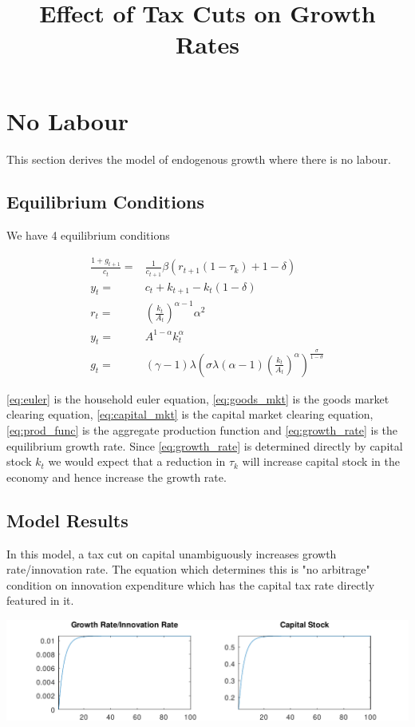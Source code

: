 \documentclass[a4paper 12pt]{article}
\title{Effect of Tax Cuts on Growth Rates}
\begin{document}
\maketitle

\section{No Labour}

This section derives the model of endogenous growth where there is no labour. 

\subsection{Equilibrium Conditions}

We have 4 equilibrium conditions

\begin{align}
    \frac{1+g_{t+1}}{c_t} =& \frac{1}{c_{t+1}} \beta (r_{t+1}(1 - \tau_k) + 1 - \delta) \label{eq:euler} \\
    y_t =& c_t + k_{t+1} - k_t(1 - \delta) \label{eq:goods_mkt} \\
    r_t =& (\frac{k_t}{A_t})^{\alpha - 1}\alpha^2 \label{eq:capital_mkt} \\
    y_t =& A^{1 - \alpha}k_t^\alpha \label{eq:prod_func} \\
    g_t =& (\gamma - 1)\lambda(\sigma \lambda (\alpha - 1) \left(\frac{k_t}{A_t}\right)^\alpha)^{\frac{\sigma}{1 - \sigma}} \label{eq:growth_rate}
\end{align}

\ref{eq:euler} is the household euler equation, \ref{eq:goods_mkt} is the goods market clearing equation, \ref{eq:capital_mkt} is the capital market clearing equation, \ref{eq:prod_func} is the aggregate production function and \ref{eq:growth_rate} is the equilibrium growth rate. Since \ref{eq:growth_rate} is determined directly by capital stock $k_t$ we would expect that a reduction in $\tau_k$ will increase capital stock in the economy and hence increase the growth rate.

\subsection{Model Results} 
In this model, a tax cut on capital unambiguously increases growth rate/innovation rate. The equation which determines this is
"no arbitrage" condition on innovation expenditure which has the capital tax rate directly featured in it.

\begin{center}
\includegraphics[scale = 0.8]{../product/irfs_nolab.pdf}
\end{center}
\end{document}
